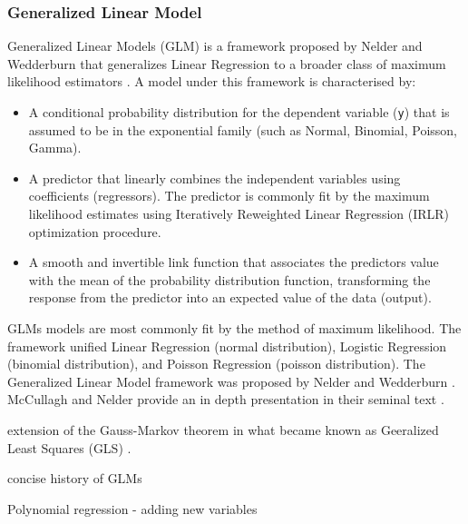 \begin{bibunit}



\subsubsection{Generalized Linear Model}
Generalized Linear Models (GLM) is a framework proposed by Nelder and Wedderburn that generalizes Linear Regression to a broader class of maximum likelihood estimators \cite{Nelder1972}. A model under this framework is characterised by:

\begin{itemize}
	\item A conditional probability distribution for the dependent variable (\texttt{y}) that is assumed to be in the exponential family (such as Normal, Binomial, Poisson, Gamma).
	\item A predictor that linearly combines the independent variables using coefficients (regressors). The predictor is commonly fit by the maximum likelihood estimates using Iteratively Reweighted Linear Regression (IRLR) optimization procedure.
	\item A smooth and invertible link function that associates the predictors value with the mean of the probability distribution function, transforming the response from the predictor into an expected value of the data (output).
\end{itemize}

 GLMs models are most commonly fit by the method of maximum likelihood. 
The framework unified Linear Regression (normal distribution), Logistic Regression (binomial distribution), and Poisson Regression (poisson distribution). The Generalized Linear Model framework was proposed by Nelder and Wedderburn \cite{Nelder1972}. McCullagh and Nelder provide an in depth presentation in their seminal text \cite{McCullagh1989}.

extension of the Gauss-Markov theorem in what became known as Geeralized Least Squares (GLS) \cite{Aitken1935}.

concise history of GLMs \cite{McCulloch2000}


Polynomial regression - adding new variables


\end{bibunit}
